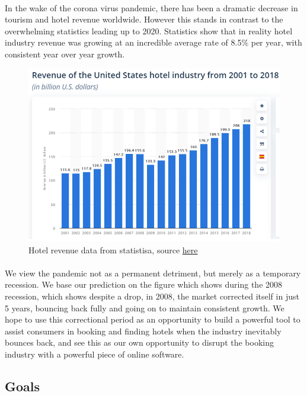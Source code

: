 \documentclass[]{article}
\begin{document}
\paragraph{}
In the wake of the corona virus pandemic, there has been a dramatic decrease in tourism and hotel revenue worldwide. However this stands in contrast to the overwhelming statistics leading up to 2020. Statistics show that in reality hotel industry revenue was growing at an incredible average rate of 8.5\% per year, with consistent year over year growth.
\begin{figure}[H]
    \centering
    \includegraphics[scale=0.4]{hotelstats.png}
    \caption{Hotel revenue data from statistisa, source \href{https://www.statista.com/statistics/245841/total-revenue-of-the-us-hotel-industry/}{here}}
\end{figure}
\paragraph{}
We view the pandemic not as a permanent detriment, but merely as a temporary recession. We base our prediction on the figure which shows during the 2008 recession, which shows despite a drop, in 2008, the market corrected itself in just 5 years, bouncing back fully and going on to maintain consistent growth. We hope to use this correctional period as an opportunity to build a powerful tool to assist consumers in booking and finding hotels when the industry inevitably bounces back, and see this as our own opportunity to disrupt the booking industry with a powerful piece of online software. 

\subsection{Goals}
\end{document}
